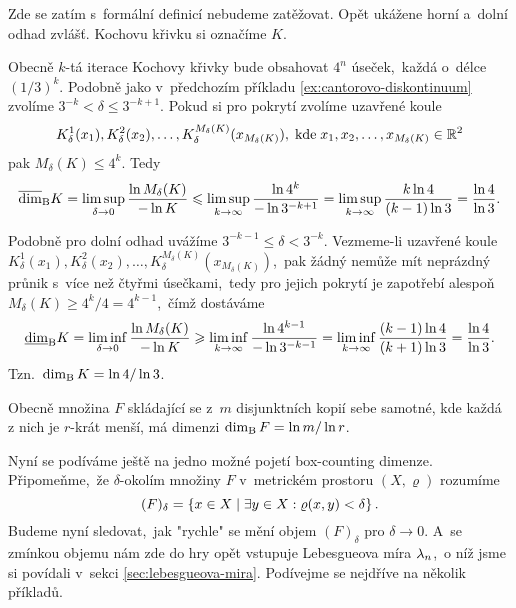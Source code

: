 \begin{example}\label{ex:kochova-krivka}
    Zde se zatím s~formální definicí nebudeme zatěžovat. Opět ukážene horní a~dolní odhad zvlášť. Kochovu křivku si označíme $K$.

    Obecně $k$-tá iterace Kochovy křivky bude obsahovat $4^n$ úseček,~každá o~délce $(1/3)^k$. Podobně jako v~předchozím příkladu \ref{ex:cantorovo-diskontinuum} zvolíme $3^{-k}<\delta\leqslant 3^{-k+1}$. Pokud si pro pokrytí zvolíme uzavřené koule
    \[K_\delta^1(x_1),K_\delta^2(x_2),\ldots,K_\delta^{M_\delta(K)}(x_{M_\delta(K)}),\;\text{kde}\;x_1,x_2,\ldots,x_{M_\delta(K)}\in\mathbb{R}^2\]
    pak $M_\delta(K)\leqslant 4^k$. Tedy
    \[\overline{\dim}_\textup{B}{K}=\limsup_{\delta\to 0}\dfrac{\ln{M_\delta(K)}}{-\ln{K}}\leqslant\limsup_{k\to\infty}\dfrac{\ln{4^k}}{-\ln{3^{-k+1}}}=\limsup_{k\to\infty}\dfrac{k\ln{4}}{(k-1)\ln{3}}=\dfrac{\ln{4}}{\ln{3}}.\]

    Podobně pro dolní odhad uvážíme $3^{-k-1}\leqslant\delta<3^{-k}$. Vezmeme-li uzavřené koule $K_\delta^1(x_1),K_\delta^2(x_2),\ldots,K_\delta^{M_\delta(K)}(x_{M_\delta(K)})$,~pak žádný nemůže mít neprázdný průnik s~více než čtyřmi úsečkami,~tedy pro jejich pokrytí je zapotřebí alespoň $M_\delta(K)\geqslant 4^k/4=4^{k-1}$,~čímž dostáváme
    \[\underline{\dim}_\textup{B}{K}=\liminf_{\delta\to 0}\dfrac{\ln{M_\delta(K)}}{-\ln{K}}\geqslant\liminf_{k\to\infty}\dfrac{\ln{4^{k-1}}}{-\ln{3^{-k-1}}}=\liminf_{k\to\infty}\dfrac{(k-1)\ln{4}}{(k+1)\ln{3}}=\dfrac{\ln{4}}{\ln{3}}.\]
    Tzn.~$\operatorname{dim_B}{K}=\ln{4}/\ln{3}$.
\end{example}
\begin{remark}
    Obecně množina $F$ skládající se z~$m$ disjunktních kopií sebe samotné, kde každá z nich je $r$-krát menší, má dimenzi $\operatorname{dim_B}{F}=\ln{m}/\ln{r}$.
\end{remark}
Nyní se podíváme ještě na jedno možné pojetí box-counting dimenze. Připomeňme,~že $\delta$-okolím množiny $F$ v~metrickém prostoru $(X,\varrho)$ rozumíme
\[(F)_\delta=\left\{x\in X\mid\exists y\in X: \varrho(x,y)<\delta\right\}.\]
Budeme nyní sledovat,~jak "rychle" se mění objem $(F)_\delta$ pro $\delta\to 0$. A~se zmínkou objemu nám zde do hry opět vstupuje Lebesgueova míra $\lambda_n$,~o níž jsme si povídali v~sekci \ref{sec:lebesgueova-mira}. Podívejme se nejdříve na několik příkladů.
